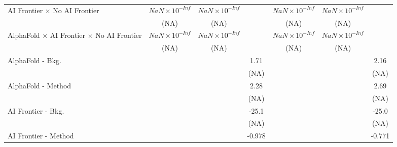 \begin{tabular}{lcccccc}
   AI Frontier $\times$ No AI Frontier                                        & $NaN\times 10^{-Inf}$  & $NaN\times 10^{-Inf}$  &                        & $NaN\times 10^{-Inf}$  & $NaN\times 10^{-Inf}$  &   \\   
                                                                              & (NA)                   & (NA)                   &                        & (NA)                   & (NA)                   &   \\   
   AlphaFold $\times$ AI Frontier $\times$ No AI Frontier                     & $NaN\times 10^{-Inf}$  & $NaN\times 10^{-Inf}$  &                        & $NaN\times 10^{-Inf}$  & $NaN\times 10^{-Inf}$  &   \\   
                                                                              & (NA)                   & (NA)                   &                        & (NA)                   & (NA)                   &   \\   
   AlphaFold - Bkg.                                                           &                        &                        & 1.71                   &                        &                        & 2.16\\   
                                                                              &                        &                        & (NA)                   &                        &                        & (NA)\\   
   AlphaFold - Method                                                         &                        &                        & 2.28                   &                        &                        & 2.69\\   
                                                                              &                        &                        & (NA)                   &                        &                        & (NA)\\   
   AI Frontier - Bkg.                                                         &                        &                        & -25.1                  &                        &                        & -25.0\\   
                                                                              &                        &                        & (NA)                   &                        &                        & (NA)\\   
   AI Frontier - Method                                                       &                        &                        & -0.978                 &                        &                        & -0.771\\   

\end{tabular}
